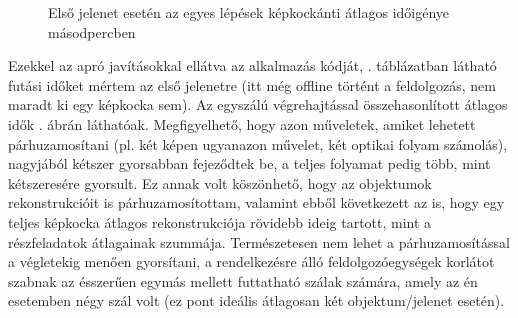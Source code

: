 \begin{figure}[b]
\centering
{}
\caption{Első jelenet esetén az egyes lépések képkockánti átlagos időigénye másodpercben \label{fig:scene1_stats}}
\end{figure}

Ezekkel az apró javításokkal ellátva az alkalmazás kódját, . táblázatban látható futási időket mértem az első jelenetre (itt még offline történt a feldolgozás, nem maradt ki egy képkocka sem). Az egyszálú végrehajtással összehasonlított átlagos idők . ábrán láthatóak. Megfigyelhető, hogy azon műveletek, amiket lehetett párhuzamosítani (pl. két képen ugyanazon művelet, két optikai folyam számolás), nagyjából kétszer gyorsabban fejeződtek be, a teljes folyamat pedig több, mint kétszeresére gyorsult. Ez annak volt köszönhető, hogy az objektumok rekonstrukcióit is párhuzamosítottam, valamint ebből következett az is, hogy egy teljes képkocka átlagos rekonstrukciója rövidebb ideig tartott, mint a részfeladatok átlagainak szummája. Természetesen nem lehet a párhuzamosítással a végletekig menően gyorsítani, a rendelkezésre álló feldolgozóegységek korlátot szabnak az ésszerűen egymás mellett futtatható szálak számára, amely az én esetemben négy szál volt (ez pont ideális átlagosan két objektum/jelenet esetén).

